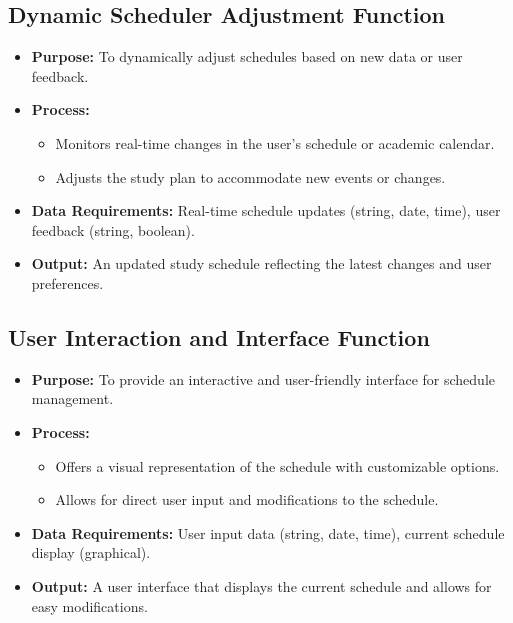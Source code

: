 \documentclass[12pt]{article}
\begin{document}
\subsection*{Dynamic Scheduler Adjustment Function}
\begin{itemize}
    \item \textbf{Purpose:} To dynamically adjust schedules based on new data or user feedback.
    \item \textbf{Process:}
    \begin{itemize}
        \item Monitors real-time changes in the user's schedule or academic calendar.
        \item Adjusts the study plan to accommodate new events or changes.
    \end{itemize}
    \item \textbf{Data Requirements:} Real-time schedule updates (string, date, time), user feedback (string, boolean).
    \item \textbf{Output:} An updated study schedule reflecting the latest changes and user preferences.
\end{itemize}

\subsection*{User Interaction and Interface Function}
\begin{itemize}
    \item \textbf{Purpose:} To provide an interactive and user-friendly interface for schedule management.
    \item \textbf{Process:}
    \begin{itemize}
        \item Offers a visual representation of the schedule with customizable options.
        \item Allows for direct user input and modifications to the schedule.
    \end{itemize}
    \item \textbf{Data Requirements:} User input data (string, date, time), current schedule display (graphical).
    \item \textbf{Output:} A user interface that displays the current schedule and allows for easy modifications.
\end{itemize}

\end{document}
